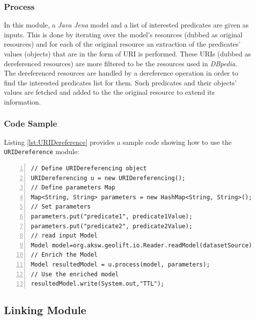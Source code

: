 \documentclass[a4paper,twoside,bibtotoc,abstracton,12pt,BCOR=15mm]{article}
\begin{document}
\subsubsection{Process}
 In this module, a \emph{Java Jena} model and a list of interested predicates are given as inputs.
 This is done by iterating over the model's resources (dubbed as original resources) 
 and for each of the original resource an extraction of the predicates' values (objects) that are in the form of URI is performed. 
 These URIs (dubbed as dereferenced resources) are more filtered to be the resources used in \emph{DBpedia}.
 The dereferenced resources are handled by a dereference operation in order to find the interested predicates list for them.
 Such predicates and their objects' values are fetched and added to the the original resource to extend its information.
\subsubsection{Code Sample}
Listing \ref{lst:URIDereference} provides a sample code showing how to use the \texttt{URIDereference} module:

\begin{lstlisting}[label=lst:URIDereference, numbers=left, numberstyle=\tiny, caption = Code fragment to call the \texttt{URIDereferencing} class.]
// Define URIDereferencing object
URIDereferencing u = new URIDereferencing();
// Define parameters Map
Map<String, String> parameters = new HashMap<String, String>();
// Set parameters
parameters.put("predicate1", predicate1Value);
parameters.put("predicate2", predicate2Value);
// read input Model
Model model=org.aksw.geolift.io.Reader.readModel(datasetSource);
// Enrich the Model
Model resultedModel = u.process(model, parameters);
// Use the enriched model
resultedModel.write(System.out,"TTL");
\end{lstlisting}


\subsection{Linking Module}
\end{document}
